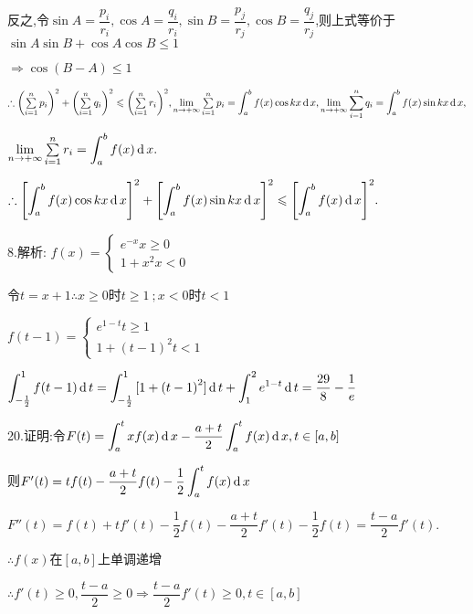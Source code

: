 反之,令$\sin A = \dfrac{{{p_i}}}{{{r_i}}},\cos A = \dfrac{{{q_i}}}{{{r_i}}},\sin B = \dfrac{{{p_j}}}{{{r_j}}},\cos B = \dfrac{{{q_j}}}{{{r_j}}}$,则上式等价于$\sin A\sin B + \cos A\cos B \le 1 $

$\Rightarrow \cos (B - A) \le 1$

$\therefore {\left( {\sum\limits_{i = 1}^n {{p_i}} } \right)^2} + {\left( {\sum\limits_{i = 1}^n {{q_i}} } \right)^2} \leqslant {\left( {\sum\limits_{i = 1}^n {{r_i}} } \right)^2},\lim\limits_{n \to +\infty} \sum\limits_{i = 1}^n {{p_i}}  = \displaystyle\int_a^b {f(x)\cos kx\operatorname{\mathop{}\!\mathrm{d}} x} ,\lim\limits_{n \to +\infty} \sum\limits_{i = 1}^n {{q_i}}  = \displaystyle\int_a^b {f(x)\sin kx\operatorname{\mathop{}\!\mathrm{d}} x} ,$

$\lim\limits_{n \to +\infty} \sum\limits_{i = 1}^n {{r_i}}  = \displaystyle\int_a^b {f(x)\operatorname{\mathop{}\!\mathrm{d}} x} .$

$\therefore {\left[ {\displaystyle\int_a^b {f(x)\cos kx\operatorname{\mathop{}\!\mathrm{d}}x} } \right]^2} + {\left[ {\displaystyle\int_a^b {f(x)\sin kx\operatorname{\mathop{}\!\mathrm{d}} x} } \right]^2} \leqslant {\left[ {\displaystyle\int_a^b {f(x)\operatorname{\mathop{}\!\mathrm{d}}x} } \right]^2}.$

8.解析:
$f(x) = \left\{ \begin{array}{l}
{e^{ - x}} x \ge 0\\
1 + {x^2} x < 0
\end{array} \right.$

令$t = x + 1$$\therefore x \ge 0$时$t \ge 1\ ;$$x < 0 $时$t < 1$

$f(t - 1) = \left\{ \begin{array}{l}
{e^{1 - t}} t \ge 1\\
1 + {(t - 1)^2} t < 1
\end{array} \right.$

$\displaystyle\int_{ - \frac{1}{2}}^1 {f(t - 1)\operatorname{\mathop{}\!\mathrm{d}} t}  = \displaystyle\int_{ - \frac{1}{2}}^1 {[1 + {{(t - 1)}^2}]\operatorname{\mathop{}\!\mathrm{d}} t}  + \displaystyle\int_1^2 {{e^{1 - t}}} \operatorname{\mathop{}\!\mathrm{d}} t = \dfrac{{29}}{8} - \dfrac{1}{e}$

20.证明:令$F(t) = \displaystyle\int_a^t {xf(x)\operatorname{\mathop{}\!\mathrm{d}} x}  - \dfrac{{a + t}}{2}\displaystyle\int_a^t {f(x)\operatorname{\mathop{}\!\mathrm{d}} x} ,t \in [a,b]$

则$F'(t) = tf(t) - \dfrac{{a + t}}{2}f(t) - \dfrac{1}{2}\displaystyle\int_a^t {f(x)\operatorname{\mathop{}\!\mathrm{d}} x} $

$F''(t) = f(t) + tf'(t) - \dfrac{1}{2}f(t) - \dfrac{{a + t}}{2}f'(t) - \dfrac{1}{2}f(t) = \dfrac{{t - a}}{2}f'(t).$

$\therefore f(x)$在$[a,b]$上单调递增

$\therefore f'(t) \ge 0,\dfrac{{t - a}}{2} \ge 0 \Rightarrow \dfrac{{t - a}}{2}f'(t) \ge 0,t \in [a,b]$

